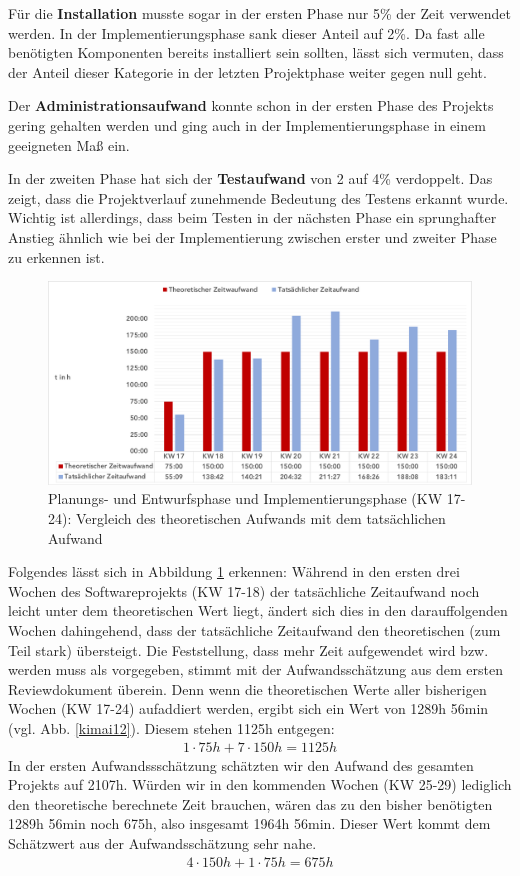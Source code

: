 \documentclass[../review_2.tex]{subfiles}
\begin{document}
Für die \textbf{Installation} musste sogar in der ersten Phase nur 5\% der Zeit verwendet werden. In der Implementierungsphase sank dieser Anteil auf 2\%. Da fast alle benötigten Komponenten bereits installiert sein sollten, lässt sich vermuten, dass der Anteil dieser Kategorie in der letzten Projektphase weiter gegen null geht.

Der \textbf{Administrationsaufwand} konnte schon in der ersten Phase des Projekts gering gehalten werden und ging auch in der Implementierungsphase in einem geeigneten Maß ein.

In der zweiten Phase hat sich der \textbf{Testaufwand} von 2 auf 4\% verdoppelt. Das zeigt, dass die Projektverlauf zunehmende Bedeutung des Testens erkannt wurde. Wichtig ist allerdings, dass beim Testen in der nächsten Phase ein sprunghafter Anstieg ähnlich wie bei der Implementierung zwischen erster und zweiter Phase zu erkennen ist.

\begin{figure} [h]
    \centering
    \includegraphics[width = \linewidth]{img/kimai8.pdf}
    \caption{Planungs- und Entwurfsphase und Implementierungsphase (KW 17-24): Vergleich des theoretischen Aufwands mit dem tatsächlichen Aufwand}
    \label{kimai8}
\end{figure} 
Folgendes lässt sich in Abbildung \ref{kimai8} erkennen:
Während in den ersten drei Wochen des Softwareprojekts (KW 17-18) der tatsächliche Zeitaufwand noch leicht unter dem theoretischen Wert liegt, ändert sich dies in den darauffolgenden Wochen dahingehend, dass der tatsächliche Zeitaufwand den theoretischen (zum Teil stark) übersteigt.
Die Feststellung, dass mehr Zeit aufgewendet wird bzw. werden muss als vorgegeben,  stimmt mit der Aufwandsschätzung aus dem ersten Reviewdokument überein.
Denn wenn die theoretischen Werte aller bisherigen Wochen (KW 17-24) aufaddiert werden, ergibt sich ein Wert von 1289h 56min (vgl. Abb. \ref{kimai12}). Diesem stehen 1125h entgegen:
\begin{align*}
    1 \cdot 75h+7 \cdot 150h= 1125h
\end{align*}
In der ersten Aufwandssschätzung schätzten wir den Aufwand des gesamten Projekts auf 2107h.
Würden wir in den kommenden Wochen (KW 25-29) \glqq lediglich\grqq{} den theoretische berechnete Zeit brauchen, wären das zu den bisher benötigten 1289h 56min noch 675h, also insgesamt 1964h 56min. Dieser Wert kommt dem Schätzwert aus der Aufwandsschätzung sehr nahe.
\begin {align*}
4 \cdot 150h + 1 \cdot 75h = 675h
\end{align*}
\end{document}

